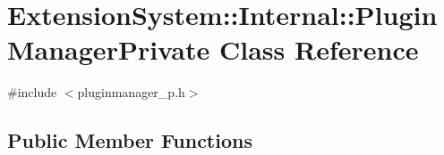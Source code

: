 \hypertarget{class_extension_system_1_1_internal_1_1_plugin_manager_private}{\section{\-Extension\-System\-:\-:\-Internal\-:\-:\-Plugin\-Manager\-Private \-Class \-Reference}
\label{class_extension_system_1_1_internal_1_1_plugin_manager_private}
}


{\ttfamily \#include $<$pluginmanager\-\_\-p.\-h$>$}

\subsection*{\-Public \-Member \-Functions}
